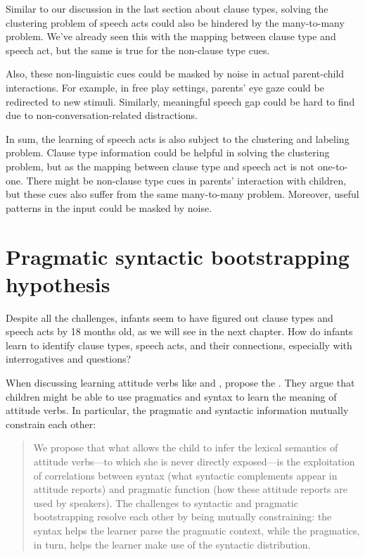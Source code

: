 Similar to our discussion in the last section about clause types, solving the clustering problem of speech acts could also be hindered by the many-to-many problem. We've already seen this with the mapping between clause type and speech act, but the same is true for the non-clause type cues. %


Also, these non-linguistic cues could be masked by noise in actual parent-child interactions. For example, in free play settings, parents' eye gaze could be redirected to new stimuli. Similarly, meaningful speech gap could be hard to find due to non-conversation-related distractions.  %

In sum, the learning of speech acts is also subject to the clustering and labeling problem. Clause type information could be helpful in solving the clustering problem, but as the mapping between clause type and speech act is not one-to-one. There might be non-clause type cues in parents' interaction with children, but these cues also suffer from the same many-to-many problem. Moreover, useful patterns in the input could be masked by noise. %



\section{Pragmatic syntactic bootstrapping hypothesis}
\label{sec:intro:prag-syn-bootstrap}
Despite all the challenges, infants seem to have figured out clause types and speech acts by 18 months old, as we will see in the next chapter. How do infants learn to identify clause types, speech acts, and their connections, especially with interrogatives and questions?

When discussing learning attitude verbs like  and , \textcite{hacquardlidz2018} propose the \hypos{}. They argue that children might be able to use pragmatics and syntax to learn the meaning of attitude verbs. In particular, the pragmatic and syntactic information mutually constrain each other:

\begin{quote}
We propose that what allows the child to infer the lexical semantics of attitude verbs—to which she is never directly exposed—is the exploitation of correlations between syntax (what syntactic complements appear in attitude reports) and pragmatic function (how these attitude reports are used by speakers). The challenges to syntactic and pragmatic bootstrapping resolve each other by being mutually constraining: the syntax helps the learner parse the pragmatic context, while the pragmatics, in turn, helps the learner make use of the syntactic distribution. 

\hspace*{\fill}\hfill \textcite[p.4-5]{hacquardlidz2018}
\end{quote}


